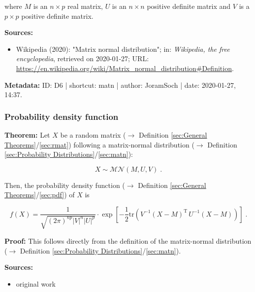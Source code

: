 \documentclass[a4paper,12pt,twoside]{book}
\begin{document}
where $M$ is an $n \times p$ real matrix, $U$ is an $n \times n$ positive definite matrix and $V$ is a $p \times p$ positive definite matrix.


\vspace{1em}
\textbf{Sources:}
\begin{itemize}
\item Wikipedia (2020): "Matrix normal distribution"; in: \textit{Wikipedia, the free encyclopedia}, retrieved on 2020-01-27; URL: \url{https://en.wikipedia.org/wiki/Matrix_normal_distribution#Definition}.
\end{itemize}


\vspace{1em}
\textbf{Metadata:} ID: D6 | shortcut: matn | author: JoramSoch | date: 2020-01-27, 14:37.
\vspace{1em}



\subsubsection[\textbf{Probability density function}]{Probability density function} \label{sec:matn-pdf}
\setcounter{equation}{0}

\textbf{Theorem:} Let $X$ be a random matrix ($\rightarrow$ Definition \ref{sec:General Theorems}/\ref{sec:rmat}) following a matrix-normal distribution ($\rightarrow$ Definition \ref{sec:Probability Distributions}/\ref{sec:matn}):

\begin{equation} \label{eq:matn-pdf-matn}
X \sim \mathcal{MN}(M, U, V) \; .
\end{equation}

Then, the probability density function ($\rightarrow$ Definition \ref{sec:General Theorems}/\ref{sec:pdf}) of $X$ is

\begin{equation} \label{eq:matn-pdf-matn-pdf}
f(X) = \frac{1}{\sqrt{(2\pi)^{np} |V|^n |U|^p}} \cdot \exp\left[-\frac{1}{2} \mathrm{tr}\left( V^{-1} (X-M)^\mathrm{T} \, U^{-1} (X-M) \right) \right] \; .
\end{equation}


\vspace{1em}
\textbf{Proof:} This follows directly from the definition of the matrix-normal distribution ($\rightarrow$ Definition \ref{sec:Probability Distributions}/\ref{sec:matn}).


\vspace{1em}
\textbf{Sources:}
\begin{itemize}
\item original work\end{itemize}
\end{document}
